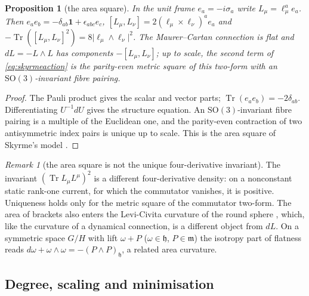 \documentclass[aps,pra,onecolumn,superscriptaddress,nofootinbib,10pt]{revtex4-2}
\newtheorem{proposition}[theorem]{Proposition}
\theoremstyle{definition}
\theoremstyle{remark}
\newtheorem{remark}[theorem]{Remark}
\newcommand{\tr}{\operatorname{Tr}}
\newcommand{\SO}{\mathrm{SO}}
\begin{document}
\begin{proposition}[the area square]\label{prop:areasq}
In the unit frame $e_a=-i\sigma_a$ write $L_\mu=\ell_\mu^ae_a$.  Then $e_ae_b=-\delta_{ab}\mathbf1+\epsilon_{abc}e_c$,
$[L_\mu,L_\nu]=2(\ell_\mu\times\ell_\nu)^ae_a$ and $-\tr([L_\mu,L_\nu]^2)=8\lvert\ell_\mu\wedge\ell_\nu\rvert^2$.  The Maurer--Cartan connection is flat
and $dL=-L\wedge L$ has components $-[L_\mu,L_\nu]$; up to scale, the second term of \eqref{eq:skyrmeaction} is the
parity-even metric square of this two-form with an $\SO(3)$-invariant fibre pairing.
\end{proposition}
\begin{proof}
The Pauli product gives the scalar and vector parts; $\tr(e_ae_b)=-2\delta_{ab}$.  Differentiating $U^{-1}dU$ gives the
structure equation.  An $\SO(3)$-invariant fibre pairing is a multiple of the Euclidean one, and the parity-even
contraction of two antisymmetric index pairs is unique up to scale.  This is the area square of Skyrme's
model \cite{n6:skyrme}.
\end{proof}
\begin{remark}[the area square is not the unique four-derivative invariant]\label{rem:notunique}
The invariant $(\tr L_\mu L^\mu)^2$ is a different four-derivative density: on a nonconstant static rank-one
current, for which the commutator vanishes, it is positive.  Uniqueness holds only for the metric square
of the commutator two-form.  The area of brackets also enters the Levi-Civita curvature of the round
sphere \cite[Prop.~5.3(ii)]{PaperI}, which, like the curvature of a dynamical connection, is a
different object from $dL$.  On a symmetric space $G/H$ with lift $\omega+P$ ($\omega\in\mathfrak h$, $P\in\mathfrak m$) the isotropy
part of flatness reads $d\omega+\omega\wedge\omega=-(P\wedge P)_{\mathfrak h}$, a related area curvature.
\end{remark}

\subsection{Degree, scaling and minimisation}
\end{document}
